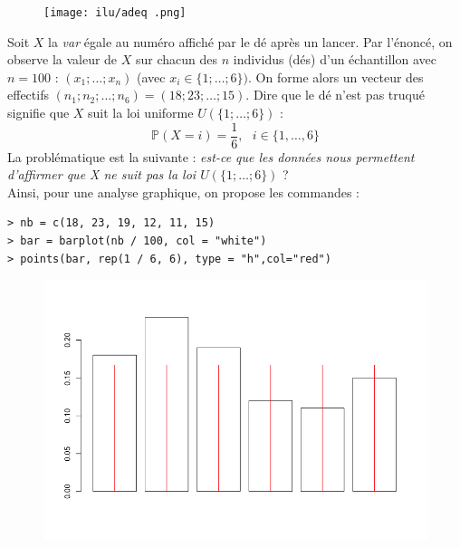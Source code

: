 
\begin{figure}[H]\begin{center}\texttt{[image: ilu/adeq .png]}\end{center}\end{figure}



Soit $X$ la \textit{var} égale au numéro affiché par le dé après un lancer. Par l'énoncé, on observe la valeur de $X$ sur chacun des $n$ individus (dés) d'un échantillon avec $n = 100$ : $(x_{1}; \dots ; x_{n})$ (avec $x_{i} \in \{1; \dots ; 6\})$. On forme alors un vecteur des effectifs $(n_{1}; n_{2}; \dots ; n_{6}) = (18; 23; \dots ; 15)$.\newline
Dire que le dé n'est pas truqué signifie que $X$ suit la loi uniforme $\mathit{U}(\{1; \dots ; 6\})$ :
$$\mathbb{P}(X=i) = \frac{1}{6}, \textrm{ } i \in \{1,\dots, 6\}$$
La problématique est la suivante : \textit{est-ce que les données nous permettent d'affirmer que X ne suit pas la loi $\mathit{U}(\{1; \dots ; 6\})$} ?\newline
\\
Ainsi, pour une analyse graphique, on propose les commandes :
\begin{lstlisting}[language=html]
> nb = c(18, 23, 19, 12, 11, 15)
> bar = barplot(nb / 100, col = "white")
> points(bar, rep(1 / 6, 6), type = "h",col="red")
\end{lstlisting}
\begin{figure}[H]\begin{center}\includegraphics[scale=1]{ilu/adeq14.png}\end{center}\end{figure}

